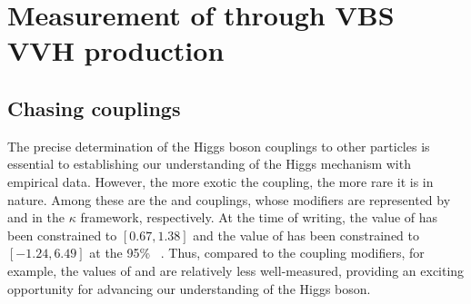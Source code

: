 \chapter{Measurement of \kVV through VBS VVH production}\label{ch:vbsvvh}

\section{Chasing couplings}
The precise determination of the Higgs boson couplings to other particles is essential to establishing our understanding of the Higgs mechanism with empirical data. 
However, the more exotic the coupling, the more rare it is in nature. 
Among these are the \HHVV and \HHH couplings, whose modifiers are represented by \kVV and \kHHH in the $\kappa$ framework, respectively. 
At the time of writing, the value of \kVV has been constrained to $[0.67, 1.38]$ and the value of \kHHH has been constrained to $[-1.24, 6.49]$ at the 95\% \CL~\cite{NatureHiggsCMS2022}. 
Thus, compared to the \kV coupling modifiers, for example, the values of \kVV and \kHHH are relatively less well-measured, providing an exciting opportunity for advancing our understanding of the Higgs boson. 

